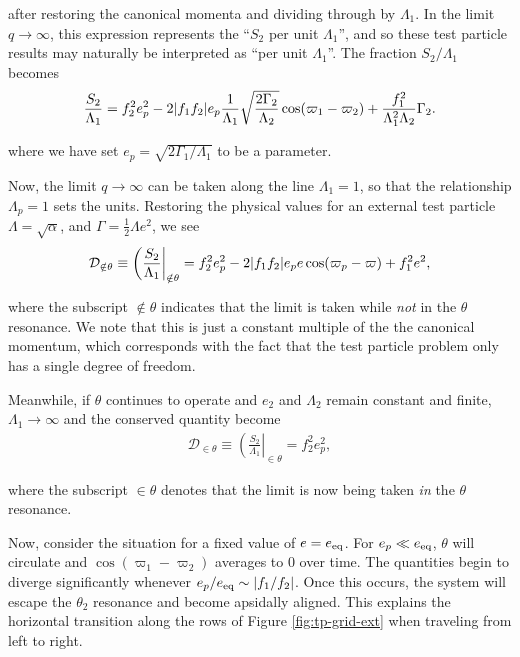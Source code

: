 \documentclass[usenatbib,twocolumn]{mnras}
\DeclarePairedDelimiter{\abs}{|}{|}
\begin{document}
\noindent after restoring the canonical momenta and dividing
through by \(\Lambda_1\).  In the limit \(q\to\infty\), this expression
represents the ``$S_2$ per unit $\Lambda_1$'', and so these
test particle results may naturally be interpreted as ``per
unit $\Lambda_1$''.  The fraction \(S_2/\Lambda_1\) becomes
\begin{align}
  \frac{S_2}{\Lambda_1} = f_2^2e_p^2
  -2\abs{f_1f_2}e_p
  \frac{1}{\Lambda_1}
  \sqrt{\frac{2\Gamma_2}{\Lambda_2}}\cos(\varpi_1-\varpi_2)
  + \frac{f_1^2}{\Lambda_1^2\Lambda_2}\Gamma_2.
\end{align}

\noindent where we have set \(e_p =
\sqrt{2\Gamma_1/\Lambda_1}\) to be a parameter.

Now, the limit \(q\to\infty\) can be taken along the line \(\Lambda_1 =
1\), so that the relationship \(\Lambda_p = 1\) sets the units.
Restoring the physical values for an external test particle
\(\Lambda=\sqrt{\alpha}\), and \(\Gamma=\frac12\Lambda e^2\), we see
\begin{align}
    \label{eq:tpcons}
\mathcal{D}_{\notin\theta}\equiv 
    \left(\frac{S_2}{\Lambda_1}\right|_{\notin\theta} = f_2^2e_p^2
    -2\abs{f_1f_2}e_p e\cos(\varpi_p-\varpi) + f_1^2e^2,
  \end{align}

\noindent
where the subscript \(\notin\theta\) indicates that the limit is taken while
\emph{not} in the \(\theta\) resonance.
We note that this is just a constant multiple of
the the canonical momentum, which corresponds with the fact that the
test particle problem only has a single degree of freedom.

Meanwhile, if \(\theta\) continues to operate and \(e_2\) and \(\Lambda_2\)
remain constant and finite, \(\Lambda_1\to\infty\) and the conserved
quantity become
\begin{align}
    \label{eq:tpcons}
\mathcal{D}_{\in\theta}\equiv 
    \left(\frac{S_2}{\Lambda_1}\right|_{\in\theta} = f_2^2e_p^2,
  \end{align}

\noindent
where the subscript \(\in\theta\) denotes that the limit is now
being taken \emph{in} the \(\theta\) resonance.

Now, consider the situation for a fixed value of \(e=e_{\rm eq}\).  For
\(e_p\ll e_{\rm eq}\), \(\theta\) will circulate and
\(\cos(\varpi_1-\varpi_2)\) averages to 0 over time.  The quantities
begin to diverge significantly whenever \(e_p/e_{\rm eq}\sim
\abs{f_1/f_2}\). Once this occurs, the system will escape the
\(\theta_2\) resonance and become apsidally aligned.  This explains the
horizontal transition along the rows of Figure \ref{fig:tp-grid-ext}
when traveling from left to right.
\end{document}
